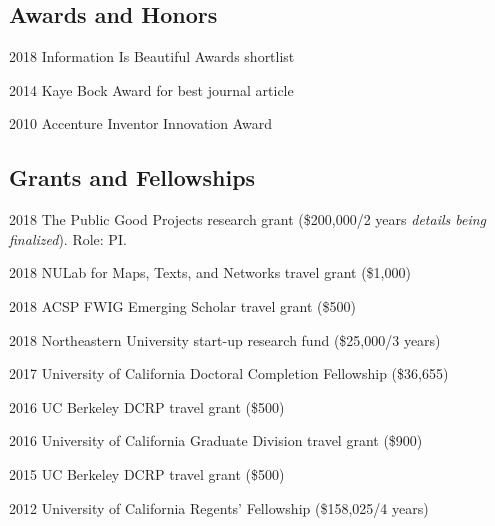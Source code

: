 \documentclass[12pt,letterpaper]{report}
\begin{document}
	\subsection*{Awards and Honors}
	
	\begin{tablist}
		
		\item[2018] \tab Information Is Beautiful Awards shortlist
				
		\item[2014] \tab Kaye Bock Award for best journal article
		
		\item[2010] \tab Accenture Inventor Innovation Award
		
	\end{tablist}

	\subsection*{Grants and Fellowships}
	
	\begin{tablist}
		
		\item[2018] \tab The Public Good Projects research grant (\$200,000/2 years \textit{details being finalized}). Role: PI.
		
		\item[2018] \tab NULab for Maps, Texts, and Networks travel grant (\$1,000)
		
		\item[2018] \tab ACSP FWIG Emerging Scholar travel grant (\$500)
		
		\item[2018] \tab Northeastern University start-up research fund (\$25,000/3 years)
		
		\item[2017] \tab University of California Doctoral Completion Fellowship (\$36,655)
		
		\item[2016] \tab UC Berkeley DCRP travel grant (\$500)
		
		\item[2016] \tab University of California Graduate Division travel grant (\$900)
		
		\item[2015] \tab UC Berkeley DCRP travel grant (\$500)
		
		\item[2012] \tab University of California Regents' Fellowship (\$158,025/4 years)
		
	\end{tablist}
	
\end{document}
